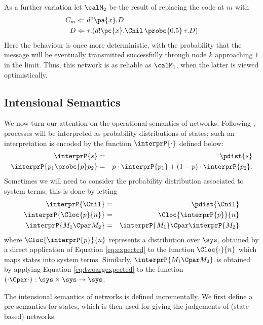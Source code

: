 \documentclass{LMCS}
\begin{document}
\begin{exa}
As a further variation let $\calM_2$ be the result of replacing the code at $m$ with 
\begin{align*}
  C_m &\Leftarrow d?\pa{x}. D \\
  D   &\Leftarrow \tau.(d!\pc{x}.\Cnil \,\probc{0.5}\, \tau.D)
\end{align*}
Here the behaviour is once more deterministic, with the probability that the message will be
eventually transmitted successfully through node $k$ approaching $1$ in the limit. Thus, this 
network is as reliable as $\calM_1$,  when the latter is viewed optimistically.
\end{exa}
\subsection{Intensional Semantics}
\label{sec:int.sem}
We now turn our attention on the operational semantics of networks.  
Following \cite{DGHM09full}, processes will be interpreted as probability 
distributions of states; such an interpretation is encoded by the function $\interprP{\cdot}$ 
defined below: 
\begin{eqnarray*}
  \interprP{s} &=& \pdist{s} \\
  \interprP{p_{1} \probc{p} p_{2}} &=& p \cdot \interprP{p_{1}} + (1 - p) \cdot \interprP{p_{2}}.
\end{eqnarray*}
Sometimes we will need to consider the probability distribution associated to system terms; 
this is done by letting 
\begin{eqnarray*}
  \interprP{\Cnil} &=& \pdist{\Cnil}\\
  \interprP{\Cloc{p}{n}} &=& \Cloc{\interprP{p}}{n}\\
  \interprP{M_1 \Cpar M_2} &=& \interprP{M_1} \Cpar \interprP{M_2}
\end{eqnarray*}
where $\Cloc{\interprP{p}}{n}$ represents a distribution over $\sys$, 
obtained by a direct application of Equation \eqref{eq:expected} 
to the function $\Cloc{\cdot}{n}$ which maps states into system terms. 
Similarly, $\interprP{M_1 \Cpar M_2}$ is obtained by 
applying Equation \eqref{eq:twoargexpected} to the function 
$(\cdot \Cpar \cdot): \sys \times \sys \rightarrow \sys$.

The intensional semantics of networks is defined incrementally. 
We first define a pre-semantics for states, which is then used 
for giving the judgements of (state based) networks.
\end{document}
